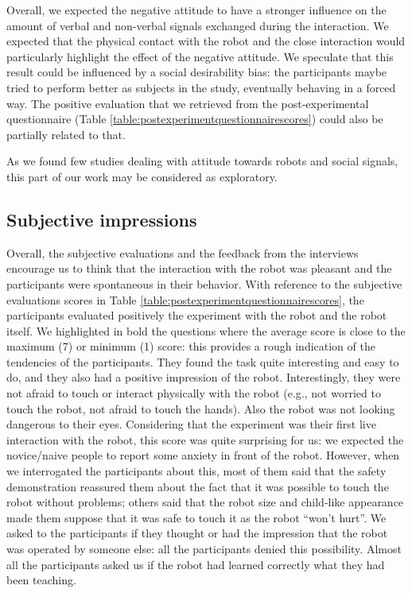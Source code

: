\documentclass[twocolumn]{svjour3}          %
\begin{document}
Overall, we expected the negative attitude to have a stronger influence on the amount of verbal and non-verbal signals exchanged during the interaction. 
We expected that the physical contact with the robot and the close interaction would particularly highlight the effect of the negative attitude. 
We speculate that this result could be influenced by a social desirability bias: the participants maybe tried to perform better as subjects in the study, eventually behaving in a forced way. The positive evaluation that we retrieved from the post-experimental questionnaire (Table \ref{table:postexperimentquestionnairescores}) could also be partially related to that.

As we found few studies dealing with attitude towards robots and social signals, this part of our work may be considered as exploratory.


\subsection{Subjective impressions}

Overall, the subjective evaluations and the feedback from the interviews encourage us to think that the interaction with the robot was pleasant and the participants were spontaneous in their behavior.
With reference to the subjective evaluations scores in Table \ref{table:postexperimentquestionnairescores}, the participants evaluated positively the experiment with the robot and the robot itself. We highlighted in bold the questions where the average score is close to the maximum (7) or minimum (1) score: this provides a rough indication of the tendencies of the participants.
They found the task quite interesting and easy to do, and they also had a positive impression of the robot.  
Interestingly, they were not afraid to touch or interact physically with the robot (e.g., not worried to touch the robot, not afraid to touch the hands). Also the robot was not looking dangerous to their eyes.
Considering that the experiment was their first live interaction with the robot, this score was quite surprising for us: we expected the novice/naive people to report some anxiety in front of the robot. However, when we interrogated the participants about this, most of them said that the safety demonstration reassured them about the fact that it was possible to touch the robot without problems; others said that the robot size and child-like appearance made them suppose that it was safe to touch it as the robot ``won't hurt''.
We asked to the participants if they thought or had the impression that the robot was operated by someone else: all the participants denied this possibility. Almost all the participants asked us if the robot had learned correctly what they had been teaching.
\end{document}
